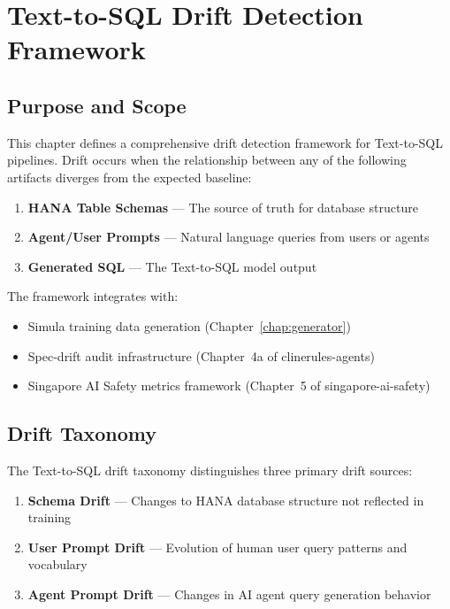 
\chapter{Text-to-SQL Drift Detection Framework}
\label{chap:tts-drift}

\section{Purpose and Scope}

This chapter defines a comprehensive drift detection framework for Text-to-SQL
pipelines. Drift occurs when the relationship between any of the following
artifacts diverges from the expected baseline:

\begin{enumerate}
  \item \textbf{HANA Table Schemas} --- The source of truth for database structure
  \item \textbf{Agent/User Prompts} --- Natural language queries from users or agents
  \item \textbf{Generated SQL} --- The Text-to-SQL model output
\end{enumerate}

The framework integrates with:
\begin{itemize}
  \item Simula training data generation (Chapter~\ref{chap:generator})
  \item Spec-drift audit infrastructure (Chapter~4a of clinerules-agents)
  \item Singapore AI Safety metrics framework (Chapter~5 of singapore-ai-safety)
\end{itemize}

\section{Drift Taxonomy}

The Text-to-SQL drift taxonomy distinguishes three primary drift sources:

\begin{enumerate}
  \item \textbf{Schema Drift} --- Changes to HANA database structure not reflected in training
  \item \textbf{User Prompt Drift} --- Evolution of human user query patterns and vocabulary
  \item \textbf{Agent Prompt Drift} --- Changes in AI agent query generation behavior
\end{enumerate}

